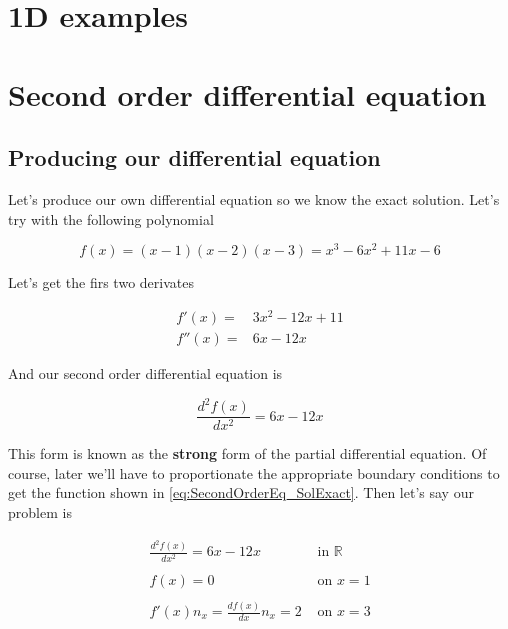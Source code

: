 \documentclass[letterpaper,10pt]{article}
\begin{document}
\section{1D examples}

\section{Second order differential equation}

\subsection{Producing our differential equation}

Let's produce our own differential equation so we know the exact solution. Let's try with the following polynomial

\begin{equation}
f(x) = (x-1)(x-2)(x-3) = x^3 - 6x^2 + 11x - 6
\label{eq:SecondOrderEq_SolExact}
\end{equation}

Let's get the firs two derivates

\[
\begin{array}{rl}
f'(x) = & 3x^2 - 12x + 11 \\
f''(x) = & 6x - 12x
\end{array}
\]

And our second order differential equation is

\begin{equation}
\frac{d^2 f(x)}{dx^2} = 6x - 12x
\label{eq:SecondOrderEq}
\end{equation}

This form is known as the \textbf{strong} form of the partial differential equation. Of course, later we'll have to proportionate the appropriate boundary conditions to get the function shown in \ref{eq:SecondOrderEq_SolExact}. Then let's say our problem is

\begin{equation}
\begin{array}{rl}
\displaystyle
\frac{d^2 f(x)}{dx^2} = 6x - 12x & \textrm{ in } \mathbb{R} \\ \\
\displaystyle
f(x) = 0 & \textrm{ on } x = 1 \\ \\
\displaystyle
f'(x) n_x = \frac{d f(x)}{d x} n_x = 2 & \textrm{ on } x = 3 
\end{array}
\label{eq:Problem_StrongForm}
\end{equation}
\end{document}
